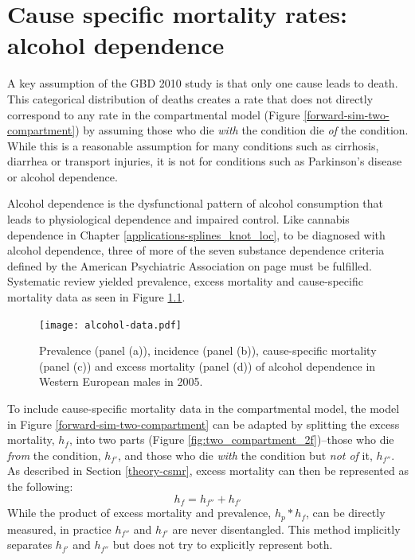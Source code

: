 \chapter{Cause specific mortality rates: alcohol dependence}
\label{applications-csmr}

A key assumption of the GBD 2010 study is that only one cause leads to death.  This categorical distribution of deaths creates a rate that does not directly correspond to any rate in the compartmental model (Figure \ref{forward-sim-two-compartment}) by assuming those who die \emph{with} the condition die \emph{of} the condition.  While this is a reasonable assumption for many conditions such as cirrhosis, diarrhea or transport injuries, it is not for conditions such as Parkinson's disease or alcohol dependence.

Alcohol dependence is the dysfunctional pattern of alcohol consumption that leads to physiological dependence and impaired control.  Like cannabis dependence in Chapter \ref{applications-splines_knot_loc}, to be diagnosed with alcohol dependence, three of more of the seven substance dependence criteria defined by the American Psychiatric Association on page \pageref{page:app-substance_dependence} must be fulfilled. \cite{american_diagnostic_2000, hasin_prevalence_2007}  Systematic review yielded prevalence, excess mortality and cause-specific mortality data as seen in Figure \ref{fig:app-alcohol data}.

    \begin{figure}[h]
        \begin{center}
            \texttt{[image: alcohol-data.pdf]}
            \caption{Prevalence (panel (a)), incidence (panel (b)), cause-specific mortality (panel (c)) and excess mortality (panel (d)) of alcohol dependence in Western European males in 2005.}
            \label{fig:app-alcohol data}
        \end{center}
    \end{figure}

To include cause-specific mortality data in the compartmental model, the model in Figure \ref{forward-sim-two-compartment} can be adapted by splitting the excess mortality, $h_{f}$, into two parts (Figure \ref{fig:two_compartment_2f})--those who die \emph{from} the condition, $h_{f'}$, and those who die \emph{with} the condition but \emph{not of} it, $h_{f''}$.  As described in Section \ref{theory-csmr}, excess mortality can then be represented as the following:
    \begin{equation}
        h_{f} = h_{f''} + h_{f'}
    \end{equation}
While the product of excess mortality and prevalence, $h_{p}*h_{f}$, can be directly measured, in practice $h_{f''}$ and $h_{f'}$ are never disentangled.  This method implicitly separates $h_{f'}$ and $h_{f''}$ but does not try to explicitly represent both.

